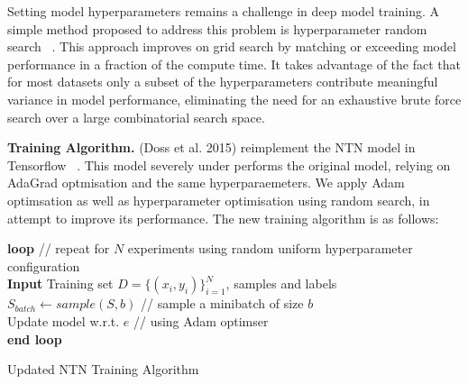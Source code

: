 \noindent Setting model hyperparameters remains a challenge in deep model training. A simple method proposed to address this problem is hyperparameter random search \unskip ~\citep{bergstra2012random}. This approach improves on grid search by matching or exceeding model performance in a fraction of the compute time. It takes advantage of the fact that for most datasets only a subset of the hyperparameters contribute meaningful variance in model performance, eliminating the need for an exhaustive brute force search over a large combinatorial search space. \par

\noindent \textbf{Training Algorithm.} (Doss et al. 2015) reimplement the NTN model in Tensorflow \unskip ~\citep{abadi2016tensorflow}. This model severely under performs the original model, relying on AdaGrad optmisation and the same hyperparaemeters. We apply Adam optimsation as well as hyperparameter optimisation using random search, in attempt to improve its performance. The new training algorithm is as follows: 

\medskip

\begin{algorithm}[H]
	\textbf{loop} // repeat for $N$ experiments using random uniform hyperparameter configuration \\
		\SetAlgoLined
		\textbf{Input} 
		Training set \begin{math} D = \{(x_i, y_i)\}_{i=1}^N \end{math}, samples and labels\;
  		\begin{math} S_{batch} \gets sample(S, b) \end{math} // sample a minibatch of size \begin{math} b \end{math} \\
		Update model w.r.t. \begin{math}  e \end{math} // using Adam optimser \\
	\textbf{end loop}
	\caption{Updated NTN Training Algorithm}
\end{algorithm} 


